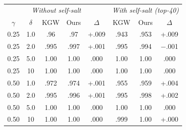 \begin{tabular}{@{}ccccc|ccc@{}}
\toprule
\multicolumn{5}{c|}{\textit{Without self-salt}} & \multicolumn{3}{c}{\textit{With self-salt (top-40)}} \\
$\gamma$ & $\delta$ & KGW & Ours & $\Delta$ & KGW & Ours & $\Delta$ \\
\midrule
0.25 & 1.0 & .96 & .97 & +.009 & .943 & .953 & +.009 \\
0.25 & 2.0 & .995 & .997 & +.001 & .995 & .994 & $-$.001 \\
0.25 & 5.0 & 1.00 & 1.00 & .000 & 1.00 & 1.00 & .000 \\
0.25 & 10 & 1.00 & 1.00 & .000 & 1.00 & 1.00 & .000 \\
0.50 & 1.0 & .972 & .974 & +.001 & .955 & .959 & +.004 \\
0.50 & 2.0 & .995 & .996 & +.001 & .995 & .998 & +.002 \\
0.50 & 5.0 & 1.00 & 1.00 & .000 & 1.00 & 1.00 & .000 \\
0.50 & 10 & 1.00 & 1.00 & .000 & .999 & 1.00 & +.000 \\
\bottomrule
\end{tabular}
